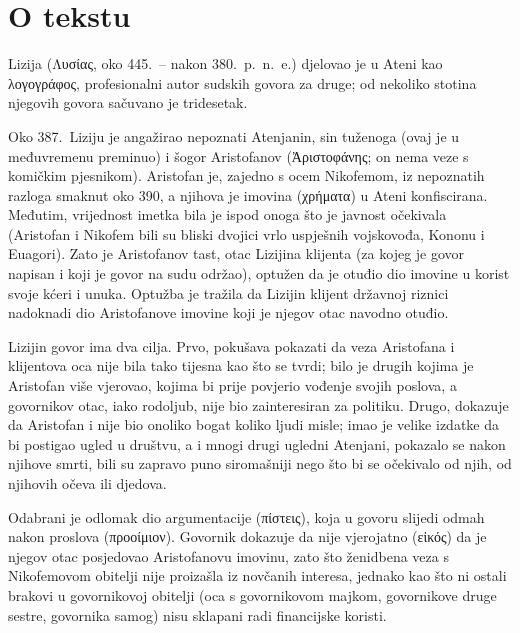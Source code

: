 


\section*{O tekstu}

Lizija \textgreek[variant=ancient]{(Λυσίας,} oko 445.\ – nakon 380.\ p.~n.~e.) djelovao je u Ateni kao \textgreek[variant=ancient]{λογογράφος,} profesionalni autor sudskih govora za druge; od nekoliko stotina njegovih govora sačuvano je tridesetak.

Oko 387.\ Liziju je angažirao nepoznati Atenjanin, sin tuženoga (ovaj je u međuvremenu preminuo) i šogor Aristofanov \textgreek[variant=ancient]{(Ἀριστοφάνης;} on nema veze s komičkim pjesnikom). Aristofan je, zajedno s ocem Nikofemom, iz nepoznatih razloga smaknut oko 390, a njihova je imovina \textgreek[variant=ancient]{(χρήματα)} u Ateni konfiscirana. Međutim, vrijednost imetka bila je ispod onoga što je javnost očekivala (Aristofan i Nikofem bili su bliski dvojici vrlo uspješnih vojskovođa, Kononu i Euagori). Zato je Aristofanov tast, otac Lizijina klijenta (za kojeg je govor napisan i koji je govor na sudu održao), optužen da je otuđio dio imovine u korist svoje kćeri i unuka. Optužba je tražila da Lizijin klijent državnoj riznici nadoknadi dio Aristofanove imovine koji je njegov otac navodno otuđio.

Lizijin govor ima dva cilja. Prvo, pokušava pokazati da veza Aristofana i klijentova oca nije bila tako tijesna kao što se tvrdi; bilo je drugih kojima je Aristofan više vjerovao, kojima bi prije povjerio vođenje svojih poslova, a govornikov otac, iako rodoljub, nije bio zainteresiran za politiku. Drugo, dokazuje da Aristofan i nije bio onoliko bogat koliko ljudi misle; imao je velike izdatke da bi postigao ugled u društvu, a i mnogi drugi ugledni Atenjani, pokazalo se nakon njihove smrti, bili su zapravo puno siromašniji nego što bi se očekivalo od njih, od njihovih očeva ili djedova.

Odabrani je odlomak dio argumentacije \textgreek[variant=ancient]{(πίστεις),} koja u govoru slijedi odmah nakon proslova \textgreek[variant=ancient]{(προοίμιον).} Govornik dokazuje da nije vjerojatno \textgreek[variant=ancient]{(εἰκός)} da je njegov otac posjedovao Aristofanovu imovinu, zato što ženidbena veza s Nikofemovom obitelji nije proizašla iz novčanih interesa, jednako kao što ni ostali brakovi u govornikovoj obitelji (oca s govornikovom majkom, govornikove druge sestre, govornika samog) nisu sklapani radi financijske koristi.


